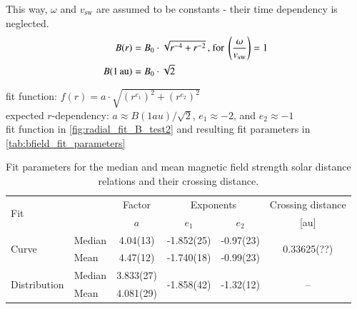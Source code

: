 This way, $\omega$ and $v_\text{sw}$ are assumed to be constants - their time dependency is neglected.
\begin{align}
	B(r) &= B_0 \cdot \sqrt{r^{-4} + r^{-2}}	\text{\,, for } \left(\frac{\omega}{v_\text{sw}}\right) = 1\\
	B(1\,\text{au}) &= B_0 \cdot \sqrt{2}
\end{align}



fit function: $f(r) = a \cdot \sqrt{\left(r^{e_1}\right)^2 + \left(r^{e_2}\right)^2}$\\
expected $r$-dependency: $a \approx B(1 au) / \sqrt{2}$, $e_1 \approx -2$, and $e_2 \approx -1$\\
fit function in \autoref{fig:radial_fit_B_test2} and resulting fit parameters in \autoref{tab:bfield_fit_parameters}\\
\begin{figure}[htb]
\end{figure}
\begin{table}
	\caption{Fit parameters for the median and mean magnetic field strength solar distance relations and their crossing distance.}
	\label{tab:bfield_fit_parameters}
	\centering
	\begin{tabular}{l l c c c c}
		\hline\hline
		\multirow{2}{*}{Fit}	&	&Factor	&\multicolumn{2}{c}{Exponents}	&Crossing distance\\
		\cline{3-4}
			&	&$a$	&$e_1$	&$e_2$	&[au]\\
		\hline
		\multirow{2}{*}{Curve}	&Median	&4.04(13)	&-1.852(25)	&-0.97(23)	&\multirow{2}{*}{0.33625(??)}\\
			&Mean	&4.47(12)	&-1.740(18)	&-0.99(23)	&\\
		\multirow{2}{*}{Distribution}	&Median	&3.833(27)	&\multirow{2}{*}{-1.858(42)}	&\multirow{2}{*}{-1.32(12)}	&\multirow{2}{*}{--}\\
			&Mean	&4.081(29)	&	&	&\\
		\hline
	\end{tabular}
\end{table}
